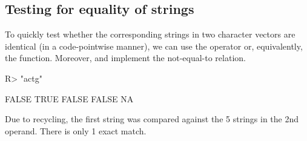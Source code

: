 \documentclass[nojss]{jss}
\begin{document}
\subsection{Testing for equality of strings}



To quickly test whether the corresponding strings in two character vectors
are identical (in a code-pointwise manner), we can use the 
operator or, equivalently, the  function.
Moreover,  and 
implement the not-equal-to relation.

\begin{Schunk}
\begin{Sinput}
R> "actg" %s===% c("ACTG", "actg", "act", "actga", NA)
\end{Sinput}
\begin{Soutput}
[1] FALSE  TRUE FALSE FALSE    NA
\end{Soutput}
\end{Schunk}

Due to recycling, the first string was compared against the
5 strings in the 2nd operand. There is only 1 exact match.
\end{document}
